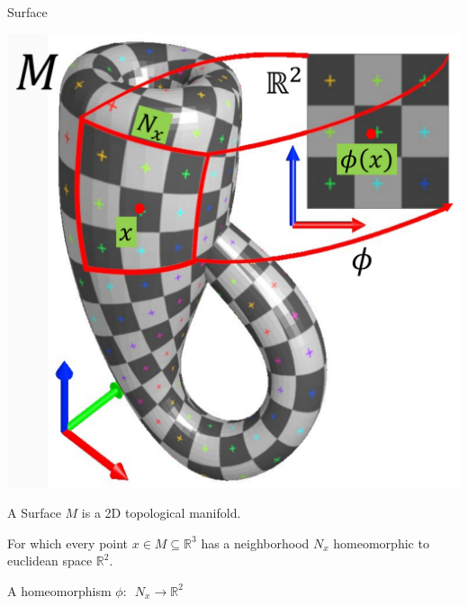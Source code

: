 \documentclass[10pt, compress, english]{beamer}
\begin{document}
\begin{frame}{Surface}


\centering

\begin{minipage}[c]{0.48\columnwidth}%
\includegraphics[width=1\columnwidth]{img/Manifolds}%
\end{minipage}\hspace{2bp}%
\begin{minipage}[c]{0.48\columnwidth}%
\vspace{40bp}


A Surface $M$ is a 2D topological manifold.

For which every point $x\in M\subseteq\mathbb{R}^{3}$ has a neighborhood
$N_{x}$ homeomorphic to euclidean space $\mathbb{R}^{2}$.

\begin{center}
A homeomorphism $\phi:\,\,\, N_{x}\rightarrow\mathbb{R}^{2}$
\par\end{center}%
\end{minipage}
\end{frame}
\end{document}
